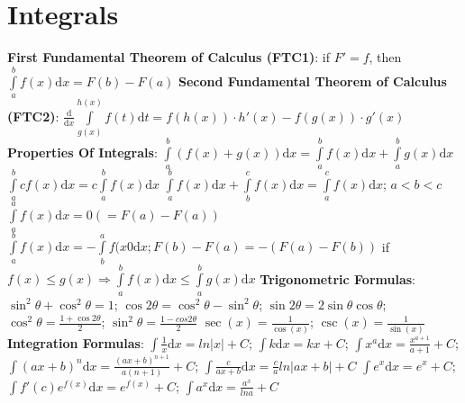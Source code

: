 \documentclass[twoside]{article}
\begin{document}
\section{Integrals}
\textbf{First Fundamental Theorem of Calculus (FTC1)}:
\indent if $F'=f$, then $\int\limits_a^bf(x) \mathrm d x = F(b)-F(a)$\newline
\textbf{Second Fundamental Theorem of Calculus (FTC2)}:
\indent $\frac{\mathrm{d}}{\mathrm{d}x} \int\limits_{g(x)}^{h(x)}f(t)\mathrm{d}t = f(h(x)) \cdot h'(x) - f(g(x)) \cdot g'(x)$ \newline
\textbf{Properties Of Integrals}:\newline
\indent $\int\limits_a^b (f(x)+g(x))\mathrm{d}x = \int\limits_a^bf(x)\mathrm d x + \int\limits_a^bg(x)\mathrm{d}x$\newline
\indent $\int\limits_a^bcf(x)\mathrm{d}x = c\int\limits_a^bf(x)\mathrm{d}x$\newline
\indent $\int\limits_a^bf(x)\mathrm{d}x + \int\limits_b^cf(x)\mathrm{d}x = \int\limits_a^cf(x)\mathrm{d}x$; $a<b<c$\newline
\indent $\int\limits_a^af(x)\mathrm{d}x = 0 (= F(a)-F(a))$\newline
\indent $\int\limits_a^bf(x)\mathrm{d}x = -\int\limits_b^af(x0\mathrm{d}x; F(b)-F(a) = -(F(a)-F(b))$\newline
\indent if $f(x) \leq g(x) \Rightarrow \int\limits_a^bf(x)\mathrm{d}x \leq \int\limits_a^bg(x)\mathrm{d}x$\newline
\textbf{Trigonometric Formulas}:\newline\newline
\indent $\sin^2\theta + \cos^2\theta=1$; $\cos2\theta=\cos^2\theta-\sin^2\theta$; $\sin2\theta=2\sin\theta\cos\theta$; $\cos^2\theta=\frac{1+\cos2\theta}{2}$; $\sin^2\theta=\frac{1-cos2\theta}{2}$\newline\newline
\indent $\sec(x)=\frac{1}{\cos(x)}$; $\csc(x)=\frac{1}{\sin(x)}$\newline\newline
\textbf{Integration Formulas}:\newline\newline
\indent $\int\frac{1}{x}\mathrm{d}x = ln|x|+C$; $\int{k}\mathrm{d}x=kx+C$; $\int{x^a}\mathrm{d}x=\frac{x^{a+1}}{a+1}+C$; $\int(ax+b)^n\mathrm{d}x=\frac{(ax+b)^{n+1}}{a(n+1)}+C$; $\int\frac{c}{ax+b}\mathrm{d}x=\frac{c}{a} ln|ax+b|+C$\newline\newline
\indent $\int{e^x}\mathrm{d}x=e^x +C$; $\int{f'(c)e^{f(x)}}\mathrm{d}x=e^{f(x)}+C$; $\int{a^x}\mathrm{d}x=\frac{a^x}{ln a}+C$\newline\newline
\end{document}
